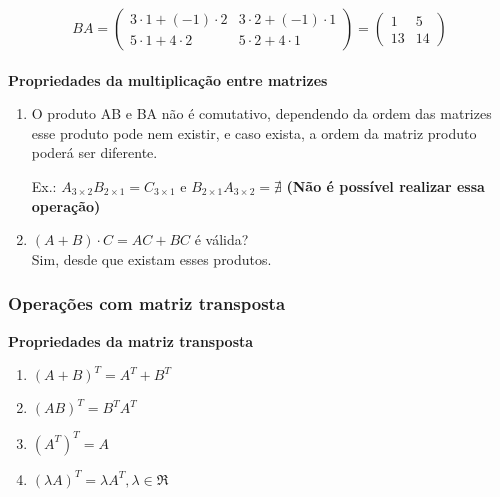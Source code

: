 \documentclass[12pt]{article}
\begin{document}
\[
BA =
    \begin{pmatrix}
        3 \cdot 1 + (-1) \cdot 2 & 3 \cdot 2 + (-1) \cdot 1 \\
        5 \cdot 1 + 4 \cdot 2 & 5 \cdot 2 + 4 \cdot 1
    \end{pmatrix}
=
    \begin{pmatrix}
         1  &  5 \\
        13  &  14
    \end{pmatrix}
\]
\\
\noindent
\textbf{Propriedades da multiplicação entre matrizes}
\begin{enumerate}[label=\textbf{\alph*)}]
    \item O produto AB e BA não é comutativo, dependendo da ordem das matrizes esse produto pode nem existir,
    e caso exista, a ordem da matriz produto poderá ser diferente.

    Ex.: \( A_{3 \times 2} B_{2 \times 1} = C_{3 \times 1}\) e \( B_{2 \times 1} A_{3 \times 2} = \nexists\)
    \textbf{(Não é possível realizar essa operação)}
    \item \((A+B) \cdot C = AC+BC\) é válida? \\
    Sim, desde que existam esses produtos.
\end{enumerate}

\subsubsection{Operações com matriz transposta}
\noindent
\textbf{Propriedades da matriz transposta}
\begin{enumerate}[label=\textbf{\alph*)}]
    \item $(A + B)^T = A^T + B^T$
    \item $(AB)^T = B^T A^T$
    \item $(A^T)^T = A$
    \item $(\lambda A)^T = \lambda A^T, \lambda \in \Re$
\end{enumerate}
\end{document}
